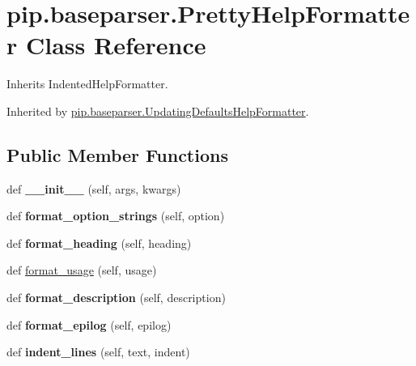 \hypertarget{classpip_1_1baseparser_1_1_pretty_help_formatter}{}\section{pip.\+baseparser.\+Pretty\+Help\+Formatter Class Reference}
\label{classpip_1_1baseparser_1_1_pretty_help_formatter}


Inherits Indented\+Help\+Formatter.



Inherited by \hyperlink{classpip_1_1baseparser_1_1_updating_defaults_help_formatter}{pip.\+baseparser.\+Updating\+Defaults\+Help\+Formatter}.

\subsection*{Public Member Functions}
\begin{DoxyCompactItemize}
\item 
\mbox{\label{classpip_1_1baseparser_1_1_pretty_help_formatter_a407c605b52431050498667e9422a4d37}} 
def {\bfseries \+\_\+\+\_\+init\+\_\+\+\_\+} (self, args, kwargs)
\item 
\mbox{\label{classpip_1_1baseparser_1_1_pretty_help_formatter_aab15a84c9886b4e87584fa5a76bb30f8}} 
def {\bfseries format\+\_\+option\+\_\+strings} (self, option)
\item 
\mbox{\label{classpip_1_1baseparser_1_1_pretty_help_formatter_ab10d7c60d61fec7d85379a27f9883210}} 
def {\bfseries format\+\_\+heading} (self, heading)
\item 
def \hyperlink{classpip_1_1baseparser_1_1_pretty_help_formatter_a456d048a07092e37ae045eed08a37347}{format\+\_\+usage} (self, usage)
\item 
\mbox{\label{classpip_1_1baseparser_1_1_pretty_help_formatter_ac9bcf061fa03e254225701e960a6cced}} 
def {\bfseries format\+\_\+description} (self, description)
\item 
\mbox{\label{classpip_1_1baseparser_1_1_pretty_help_formatter_a3e6120e9afff112a70e330d37ddd1918}} 
def {\bfseries format\+\_\+epilog} (self, epilog)
\item 
\mbox{\label{classpip_1_1baseparser_1_1_pretty_help_formatter_aa47b6da92951a2ffa4903046c3fbd076}} 
def {\bfseries indent\+\_\+lines} (self, text, indent)
\end{DoxyCompactItemize}


